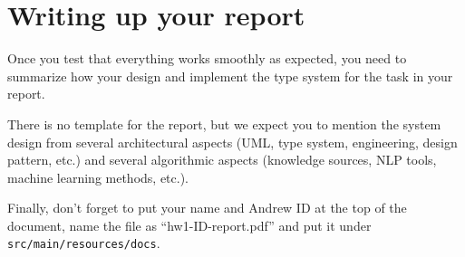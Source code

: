 
\section{Writing up your report}

Once you test that everything works smoothly as expected, you need to summarize
how your design and implement the type system for the task in your report.

There is no template for the report, but we expect you to mention the system
design from several architectural aspects (UML, type system, engineering, design
pattern, etc.) and several algorithmic aspects (knowledge sources, NLP tools,
machine learning methods, etc.).

Finally, don't forget to put your name and Andrew ID at the top of the document,
name the file as ``hw1-ID-report.pdf'' and put it under
\texttt{src/main/resources/docs}.
